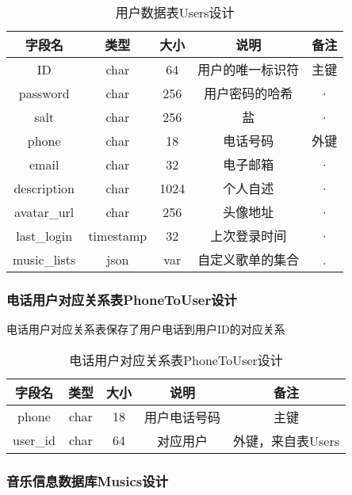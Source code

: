 \begin{table}[htbp]
\centering
\caption{用户数据表Users设计} \label{tab:users-database}
\begin{tabular}{|c|c|c|c|c|}
    \hline
    字段名 & 类型 & 大小 & 说明 & 备注 \\
    \hline
    ID & char & 64 & 用户的唯一标识符 & 主键\\
    \hline
    password & char & 256 & 用户密码的哈希 & · \\
    \hline
    salt & char & 256 & 盐 & · \\
    \hline
    phone & char & 18 & 电话号码 & 外键 \\
    \hline
    email & char & 32 & 电子邮箱 & · \\
    \hline
    description & char & 1024 & 个人自述 & · \\
    \hline
    avatar\_url & char & 256 & 头像地址 & · \\
    \hline
    last\_login & timestamp & 32 & 上次登录时间 & · \\
    \hline
    music\_lists & json & var & 自定义歌单的集合 & . \\
    \hline
\end{tabular}
\end{table}

\subsubsection{电话用户对应关系表PhoneToUser设计}

电话用户对应关系表保存了用户电话到用户ID的对应关系

\begin{table}[htbp]
\centering
\caption{电话用户对应关系表PhoneToUser设计} \label{tab:phone-user-database}
\begin{tabular}{|c|c|c|c|c|}
    \hline
    字段名 & 类型 & 大小 & 说明 & 备注 \\
    \hline
    phone & char & 18 & 用户电话号码 & 主键\\
    \hline
    user\_id & char & 64 & 对应用户 & 外键，来自表Users \\
    \hline
\end{tabular}
\end{table}

\subsubsection{音乐信息数据库Musics设计}

